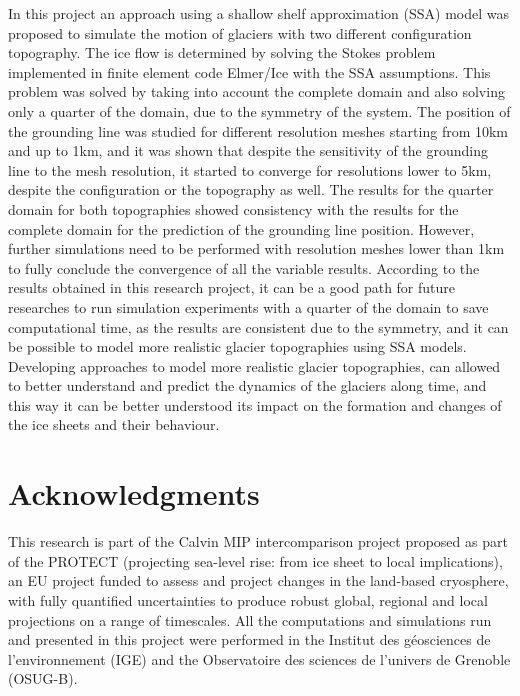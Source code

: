 \documentclass{article}
\begin{document}
In this project an approach using a shallow shelf approximation (SSA) model was proposed to simulate the motion of glaciers with two different configuration topography. The ice flow is determined by solving the Stokes problem implemented in finite element code Elmer/Ice with the SSA assumptions. This problem was solved by taking into account the complete domain and also solving only a quarter of the domain, due to the symmetry of the system. The position of the grounding line was studied for different resolution meshes starting from 10km and up to 1km, and it was shown that despite the sensitivity of the grounding line to the mesh resolution, it started to converge for resolutions lower to 5km, despite the configuration or the topography as well. The results for the quarter domain for both topographies showed consistency with the results for the complete domain for the prediction of the grounding line position. However, further simulations need to be performed with resolution meshes lower than 1km to fully conclude the convergence of all the variable results. According to the results obtained in this research project, it can be a good path for future researches to run simulation experiments with a quarter of the domain to save computational time, as the results are consistent due to the symmetry, and it can be possible to model more realistic glacier topographies using SSA models. Developing approaches to model more realistic glacier topographies, can allowed to better understand and predict the dynamics of the glaciers along time, and this way it can be better understood its impact on the formation and changes of the ice sheets and their behaviour. 

\section{Acknowledgments} 

This research is part of the Calvin MIP intercomparison project proposed as part of the  PROTECT (projecting sea-level rise: from ice sheet to local implications), an EU project funded to assess and project changes in the land-based cryosphere, with fully quantified uncertainties to produce robust global, regional and local projections on a range of timescales. All the computations and simulations run and presented in this project were performed in the Institut des géosciences de l'environnement (IGE) and the Observatoire des sciences de l'univers de Grenoble (OSUG-B).

\pagebreak


\end{document}
